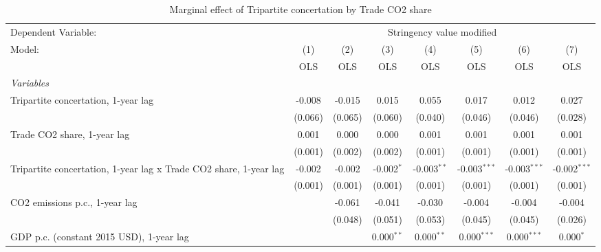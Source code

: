 
\begin{table}[htbp]
   \caption{Marginal effect of Tripartite concertation by Trade CO2 share}
   \centering
   \begin{tabular}{lccccccc}
      \toprule
      Dependent Variable: & \multicolumn{7}{c}{Stringency value modified}\\
      Model:                                                            & (1)     & (2)     & (3)          & (4)           & (5)            & (6)            & (7)\\  
                                                                        &  OLS    & OLS     & OLS          & OLS           & OLS            & OLS            & OLS\\  
      \midrule
      \emph{Variables}\\
      Tripartite concertation, 1-year lag                               & -0.008  & -0.015  & 0.015        & 0.055         & 0.017          & 0.012          & 0.027\\   
                                                                        & (0.066) & (0.065) & (0.060)      & (0.040)       & (0.046)        & (0.046)        & (0.028)\\   
      Trade CO2 share, 1-year lag                                       & 0.001   & 0.000   & 0.000        & 0.001         & 0.001          & 0.001          & 0.001\\   
                                                                        & (0.001) & (0.002) & (0.002)      & (0.001)       & (0.001)        & (0.001)        & (0.001)\\   
      Tripartite concertation, 1-year lag x Trade CO2 share, 1-year lag & -0.002  & -0.002  & -0.002$^{*}$ & -0.003$^{**}$ & -0.003$^{***}$ & -0.003$^{***}$ & -0.002$^{***}$\\   
                                                                        & (0.001) & (0.001) & (0.001)      & (0.001)       & (0.001)        & (0.001)        & (0.001)\\   
      CO2 emissions p.c., 1-year lag                                    &         & -0.061  & -0.041       & -0.030        & -0.004         & -0.004         & -0.004\\   
                                                                        &         & (0.048) & (0.051)      & (0.053)       & (0.045)        & (0.045)        & (0.026)\\   
      GDP p.c. (constant 2015 USD), 1-year lag                          &         &         & 0.000$^{**}$ & 0.000$^{**}$  & 0.000$^{***}$  & 0.000$^{***}$  & 0.000$^{*}$\\   

\end{tabular}
\end{table}
